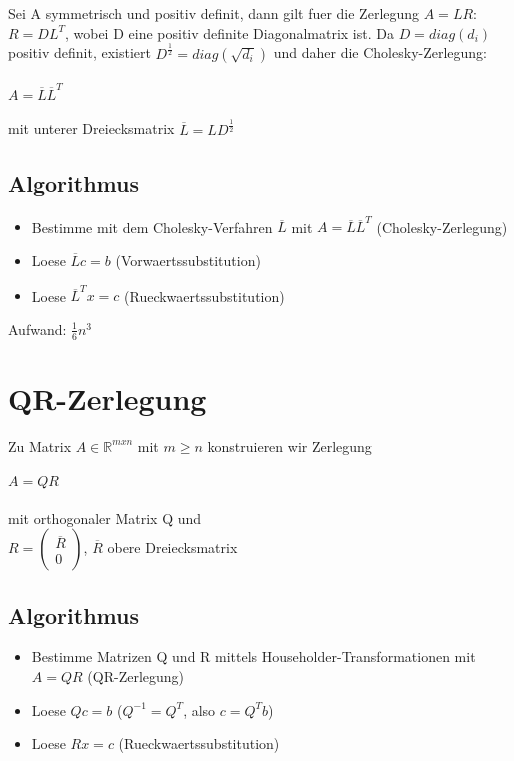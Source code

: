 \documentclass[a4paper]{scrreprt}
\begin{document}
Sei A symmetrisch und positiv definit, dann gilt fuer die Zerlegung $A = LR$: $R = DL^T$, wobei D eine positiv definite Diagonalmatrix ist. Da $D = diag(d_i)$ positiv definit, existiert $D^\frac{1}{2} = diag(\sqrt{d_i})$ und daher die Cholesky-Zerlegung:\\\\
$A = \overline{L}\overline{L}^T$\\\\
mit unterer Dreiecksmatrix $\overline{L} = LD^\frac{1}{2}$

\subsection{Algorithmus}
\begin{itemize}
	\item Bestimme mit dem Cholesky-Verfahren $\overline{L}$ mit $A = \overline{L}\overline{L}^T$ (Cholesky-Zerlegung)
	\item Loese $\overline{L}c = b$ (Vorwaertssubstitution)
	\item Loese $\overline{L}^Tx = c$ (Rueckwaertssubstitution)
\end{itemize}

Aufwand: $\frac{1}{6}n^3$

\section{QR-Zerlegung}

Zu Matrix $A \in \mathbb{R}^{mxn}$ mit $m \geq n$ konstruieren wir Zerlegung\\\\
$A = QR$\\\\
mit orthogonaler Matrix Q und\\
$R = \begin{pmatrix}\overline{R}\\0\end{pmatrix}$, $\overline{R}$ obere Dreiecksmatrix

\subsection{Algorithmus}
\begin{itemize}
	\item Bestimme Matrizen Q und R mittels Householder-Transformationen mit $A = QR$ (QR-Zerlegung)
	\item Loese $Qc = b$ ($Q^{-1} = Q^T$, also $c = Q^Tb$)
	\item Loese $Rx = c$ (Rueckwaertssubstitution)
\end{itemize}
\end{document}
